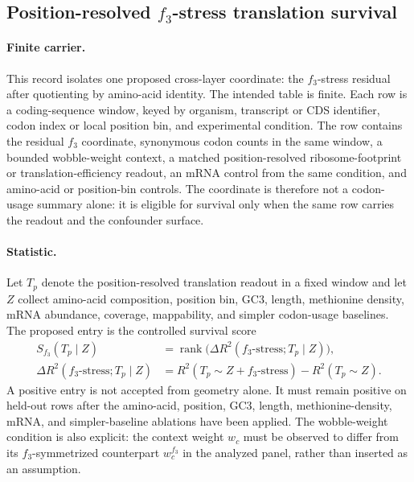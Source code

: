 \subsection{Position-resolved $f_3$-stress translation survival}
\label{sec:q6-f3-stress-position-resolved-translation-survival-cross-layer}

\paragraph{Finite carrier.}
This record isolates one proposed cross-layer coordinate: the $f_3$-stress residual after quotienting by amino-acid identity.  The intended table is finite.  Each row is a coding-sequence window, keyed by organism, transcript or CDS identifier, codon index or local position bin, and experimental condition.  The row contains the residual $f_3$ coordinate, synonymous codon counts in the same window, a bounded wobble-weight context, a matched position-resolved ribosome-footprint or translation-efficiency readout, an mRNA control from the same condition, and amino-acid or position-bin controls.  The coordinate is therefore not a codon-usage summary alone: it is eligible for survival only when the same row carries the readout and the confounder surface.

\paragraph{Statistic.}
Let $T_{p}$ denote the position-resolved translation readout in a fixed window and let $Z$ collect amino-acid composition, position bin, GC3, length, methionine density, mRNA abundance, coverage, mappability, and simpler codon-usage baselines.  The proposed entry is the controlled survival score
$$
\begin{aligned}
S_{f_3}(T_{p}\mid Z)
  &= \operatorname{rank}\bigl(\Delta R^2(f_3\text{-stress};T_p\mid Z)\bigr),\\
\Delta R^2(f_3\text{-stress};T_p\mid Z)
  &= R^2(T_p\sim Z+f_3\text{-stress})-R^2(T_p\sim Z).
\end{aligned}
$$
A positive entry is not accepted from geometry alone.  It must remain positive on held-out rows after the amino-acid, position, GC3, length, methionine-density, mRNA, and simpler-baseline ablations have been applied.  The wobble-weight condition is also explicit: the context weight $w_c$ must be observed to differ from its $f_3$-symmetrized counterpart $w_c^{f_3}$ in the analyzed panel, rather than inserted as an assumption.


